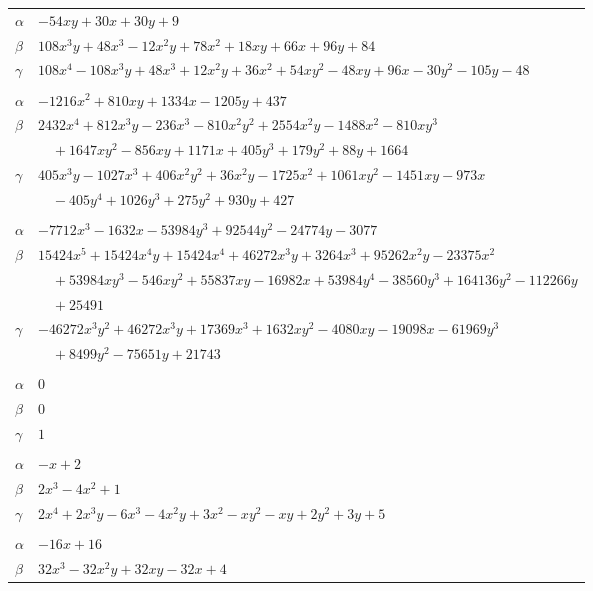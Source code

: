 \documentclass[11pt]{article}
\begin{document}
\begin{longtable}{@{}ll@{}}
$\alpha$ & $-54xy+30x+30y+9$\\
$\beta$ & $108x^{3}y+48x^{3}-12x^{2}y+78x^{2}+18xy+66x+96y+84$\\
$\gamma$ & $108x^{4}-108x^{3}y+48x^{3}+12x^{2}y+36x^{2}+54xy^{2}-48xy+96x-30y^{2}-105y-48$\\
\addlinespace[3pt]
\multicolumn{2}{@{}l}{$\{i,j\}=\{5,80\}$, $k_{ij}=2^{5}\cdot 5^{2}$}\\
$\alpha$ & $-1216x^{2}+810xy+1334x-1205y+437$\\
$\beta$ & $2432x^{4}+812x^{3}y-236x^{3}-810x^{2}y^{2}+2554x^{2}y-1488x^{2}-810xy^{3}$\\
 & $\quad +1647xy^{2}-856xy+1171x+405y^{3}+179y^{2}+88y+1664$\\
$\gamma$ & $405x^{3}y-1027x^{3}+406x^{2}y^{2}+36x^{2}y-1725x^{2}+1061xy^{2}-1451xy-973x$\\
 & $\quad -405y^{4}+1026y^{3}+275y^{2}+930y+427$\\
\addlinespace[3pt]
\multicolumn{2}{@{}l}{$\{i,j\}=\{5,81\}$, $k_{ij}=3\cdot 5^{2}\cdot 7\cdot 13$}\\
$\alpha$ & $-7712x^{3}-1632x-53984y^{3}+92544y^{2}-24774y-3077$\\
$\beta$ & $15424x^{5}+15424x^{4}y+15424x^{4}+46272x^{3}y+3264x^{3}+95262x^{2}y-23375x^{2}$\\
 & $\quad +53984xy^{3}-546xy^{2}+55837xy-16982x+53984y^{4}-38560y^{3}+164136y^{2}-112266y$\\
 & $\quad +25491$\\
$\gamma$ & $-46272x^{3}y^{2}+46272x^{3}y+17369x^{3}+1632xy^{2}-4080xy-19098x-61969y^{3}$\\
 & $\quad +8499y^{2}-75651y+21743$\\
\addlinespace[3pt]
\multicolumn{2}{@{}l}{$\{i,j\}=\{5,90\}$, $k_{ij}=2$}\\
$\alpha$ & $0$\\
$\beta$ & $0$\\
$\gamma$ & $1$\\
\addlinespace[3pt]
\multicolumn{2}{@{}l}{$\{i,j\}=\{6,7\}$, $k_{ij}=2^{2}$}\\
$\alpha$ & $-x+2$\\
$\beta$ & $2x^{3}-4x^{2}+1$\\
$\gamma$ & $2x^{4}+2x^{3}y-6x^{3}-4x^{2}y+3x^{2}-xy^{2}-xy+2y^{2}+3y+5$\\
\addlinespace[3pt]
\multicolumn{2}{@{}l}{$\{i,j\}=\{6,12\}$, $k_{ij}=3$}\\
$\alpha$ & $-16x+16$\\
$\beta$ & $32x^{3}-32x^{2}y+32xy-32x+4$\\

\end{longtable}
\end{document}
